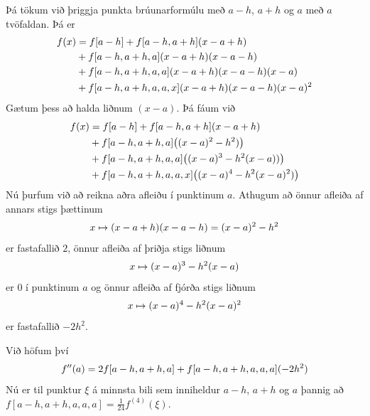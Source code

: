 \documentclass[A4paper,10pt,icelandic]{sphinxmanual}
\begin{document}
Þá tökum við þriggja punkta brúunarformúlu með \(a-h\), \(a+h\)
og \(a\) með \(a\) tvöfaldan. Þá er
\begin{gather}
\begin{split}\begin{aligned}
  f(x)&=f[a-h]+f[a-h,a+h](x-a+h)\\
  &+f[a-h,a+h,a](x-a+h)(x-a-h)\\
  &+f[a-h,a+h,a,a](x-a+h)(x-a-h)(x-a)\\
  &+f[a-h,a+h,a,a,x](x-a+h)(x-a-h)(x-a)^2\end{aligned}\end{split}\notag
\end{gather}
Gætum þess að halda liðnum \((x-a)\). Þá fáum við
\begin{gather}
\begin{split}\begin{aligned}
  f(x)&=f[a-h]+f[a-h,a+h](x-a+h)\\
  &+f[a-h,a+h,a]\big((x-a)^2-h^2)\big)\\
  &+f[a-h,a+h,a,a]\big((x-a)^3-h^2(x-a))\big)\\
  &+f[a-h,a+h,a,a,x]\big((x-a)^4-h^2(x-a)^2)\big)\end{aligned}\end{split}\notag
\end{gather}
Nú þurfum við að reikna aðra afleiðu í punktinum \(a\). Athugum að
önnur afleiða af annars stigs þættinum
\begin{gather}
\begin{split}x\mapsto (x-a+h)(x-a-h)=(x-a)^2-h^2\end{split}\notag
\end{gather}
er fastafallið \(2\), önnur afleiða af þriðja stigs liðnum
\begin{gather}
\begin{split}x\mapsto (x-a)^3-h^2(x-a)\end{split}\notag
\end{gather}
er \(0\) í punktinum \(a\) og önnur afleiða af fjórða stigs
liðnum
\begin{gather}
\begin{split}x\mapsto (x-a)^4-h^2(x-a)^2\end{split}\notag
\end{gather}
er fastafallið \(-2h^2\).

Við höfum því
\begin{gather}
\begin{split}f''(a)=2f[a-h,a+h,a]+f[a-h,a+h,a,a,a](-2h^2)\end{split}\notag
\end{gather}
Nú er til punktur \(\xi\) á minnsta bili sem inniheldur \(a-h\),
\(a+h\) og \(a\) þannig að \(f[a-h,a+h,a,a,a]=\tfrac
1{24}f^{(4)}(\xi)\).
\end{document}

